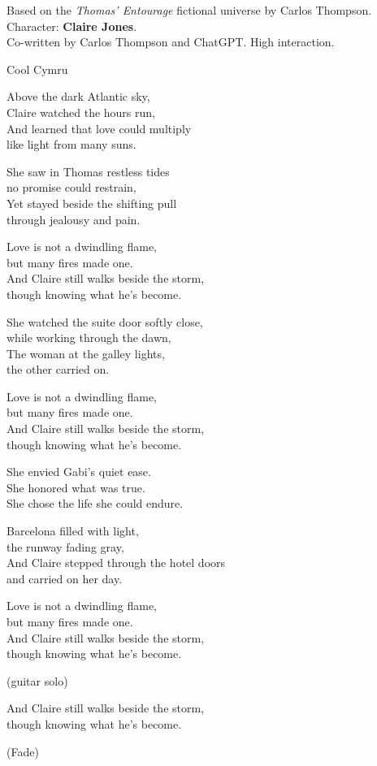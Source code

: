 

\begin{notes}
Based on the \emph{Thomas' Entourage} fictional universe by Carlos Thompson.\\
Character: \textbf{Claire Jones}.\\
Co-written by Carlos Thompson and ChatGPT. %
High interaction.
\end{notes}
\begin{style}
Cool Cymru
\end{style}
\begin{lyrics}
Above the dark Atlantic sky,\\
Claire watched the hours run,\\
And learned that love could multiply\\
like light from many suns.

She saw in Thomas restless tides\\
no promise could restrain,\\
Yet stayed beside the shifting pull\\
through jealousy and pain.

Love is not a dwindling flame,\\
but many fires made one.\\
And Claire still walks beside the storm,\\
though knowing what he’s become.

She watched the suite door softly close,\\
while working through the dawn,\\
The woman at the galley lights,\\
the other carried on.

Love is not a dwindling flame,\\
but many fires made one.\\
And Claire still walks beside the storm,\\
though knowing what he’s become.

She envied Gabi’s quiet ease.\\
She honored what was true.\\
She chose the life she could endure.

Barcelona filled with light,\\
the runway fading gray,\\
And Claire stepped through the hotel doors\\
and carried on her day.

Love is not a dwindling flame,\\
but many fires made one.\\
And Claire still walks beside the storm,\\
though knowing what he’s become.

(guitar solo)

And Claire still walks beside the storm,\\
though knowing what he’s become.

(Fade)
\end{lyrics}

